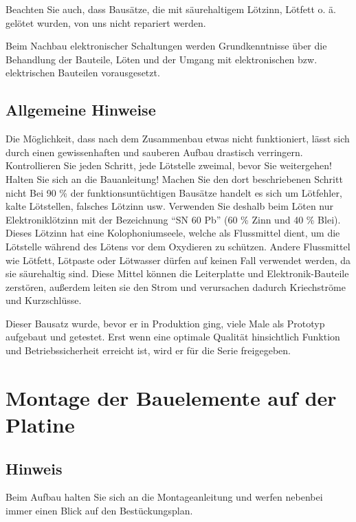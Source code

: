 \documentclass[fleqn,10pt]{SelfArx} %
\begin{document}
Beachten Sie auch, dass Bausätze, die mit säurehaltigem Lötzinn, Lötfett o. ä. gelötet wurden, von uns nicht repariert werden.

Beim Nachbau elektronischer Schaltungen werden Grundkenntnisse über die Behandlung der Bauteile, Löten und der Umgang mit elektronischen bzw. elektrischen Bauteilen vorausgesetzt.

 \subsection*{Allgemeine Hinweise}

Die Möglichkeit, dass nach dem Zusammenbau etwas nicht funktioniert, lässt sich durch einen gewissenhaften und sauberen Aufbau drastisch verringern. Kontrollieren Sie jeden Schritt, jede Lötstelle zweimal, bevor Sie weitergehen! Halten Sie sich an die Bauanleitung! Machen Sie den dort beschriebenen Schritt nicht Bei 90 \% der funktionsuntüchtigen Bausätze handelt es sich um Lötfehler, kalte Lötstellen, falsches Lötzinn usw. Verwenden Sie deshalb beim Löten nur Elektroniklötzinn mit der Bezeichnung “SN 60 Pb” (60 \% Zinn und 40 \% Blei). Dieses Lötzinn hat eine Kolophoniumseele, welche als Flussmittel dient, um die Lötstelle während des Lötens vor dem Oxydieren zu schützen. Andere Flussmittel wie Lötfett, Lötpaste oder Lötwasser dürfen auf keinen Fall verwendet werden, da sie säurehaltig sind. Diese Mittel können die Leiterplatte und Elektronik-Bauteile zerstören, außerdem leiten sie den Strom und verursachen dadurch Kriechströme und Kurzschlüsse.

Dieser Bausatz wurde, bevor er in Produktion ging, viele Male als Prototyp aufgebaut und getestet. Erst wenn eine optimale Qualität hinsichtlich Funktion und Betriebssicherheit erreicht ist, wird er für die Serie freigegeben.


\section{Montage der Bauelemente auf der Platine}

 \subsection*{Hinweis}

Beim Aufbau halten Sie sich an die Montageanleitung und werfen nebenbei immer einen Blick auf den Bestückungsplan.
\end{document}
